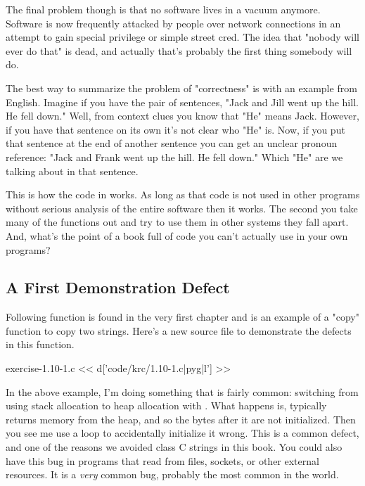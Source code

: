 The final problem though is that no software lives in a vacuum anymore. Software
is now frequently attacked by people over network connections in an attempt to
gain special privilege or simple street cred.  The idea that "nobody will ever do
that" is dead, and actually that's probably the first thing somebody will do.

The best way to summarize the problem of \krc "correctness" is with an example
from English.  Imagine if you have the pair of sentences, "Jack and Jill went up the hill.
He fell down."  Well, from context clues you know that "He" means Jack.  However,
if you have that sentence on its own it's not clear who "He" is.  Now, if you put
that sentence at the end of another sentence you can get an unclear
pronoun reference: "Jack and Frank went up the hill. He fell down."  Which "He"
are we talking about in that sentence.

This is how the code in \krc works.  As long as that code is not used in other
programs without serious analysis of the entire software then it works.  The second
you take many of the functions out and try to use them in other systems they
fall apart.  And, what's the point of a book full of code you can't actually
use in your own programs?


\subsection{A First Demonstration Defect}

Following function is found in the very first chapter and is an example
of a "copy" function to copy two strings.  Here's a new source file
to demonstrate the defects in this function.

\begin{code}{exercise-1.10-1.c}
<< d['code/krc/1.10-1.c|pyg|l'] >>
\end{code}

In the above example, I'm doing something that is fairly common: switching from
using stack allocation to heap allocation with .  What happens is,
typically  returns memory from the heap, and so the bytes after
it are not initialized.  Then you see me use a loop to accidentally initialize
it wrong.  This is a common defect, and one of the reasons we avoided class C strings
in this book.  You could also have this bug in programs that read from files,
sockets, or other external resources.  It is a \emph{very} common bug, probably
the most common in the world.

